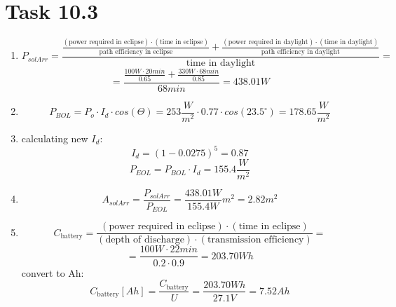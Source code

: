 \documentclass[a4paper,12pt]{article}
\begin{document}
\section*{Task 10.3}
\begin{enumerate}
 \item \[P_{solArr} = \frac{\frac{\left(\text{power required in eclipse}\right)\cdot \left(\text{time in eclipse}\right)}{\text{path efficiency in 
 eclipse}} + \frac{\left(\text{power required in daylight}\right)\cdot \left(\text{time in daylight}\right)}{\text{path efficiency in 
 daylight}}}{\text{time in daylight}} = \]
\[ = \frac{\frac{100W\cdot20min}{0.65} + \frac{330W\cdot68min}{0.85}}{68min} = 438.01W\]
 \item \[P_{BOL} = P_o \cdot I_d \cdot cos(\Theta) = 253\frac{W}{m^2}\cdot 0.77\cdot cos(23.5^{\circ}) = 178.65\frac{W}{m^2}\]
 \item calculating new $I_d$: \[I_d = (1-0.0275)^5 = 0.87\] 
 \[P_{EOL} = P_{BOL} \cdot I_d = 155.4\frac{W}{m^2}\]
 \item \[A_{solArr} = \frac{P_{solArr}}{P_{EOL}} = \frac{438.01W}{155.4W}m^2 = 2.82m^2\]
 \item \[C_{\text{battery}} = \frac{\left(\text{power required in eclipse}\right)\cdot \left(\text{time in eclipse}\right)}{\left(\text{depth of 
 discharge}\right)\cdot\left(\text{transmission efficiency}\right)} =\]
 \[ = \frac{100W\cdot 22min}{0.2\cdot 0.9} = 203.70Wh\]
 convert to Ah: 
 \[C_{\text{battery}}[Ah] = \frac{C_{\text{battery}}}{U} = \frac{203.70Wh}{27.1V} = 7.52Ah\]
\end{enumerate}
\end{document}
